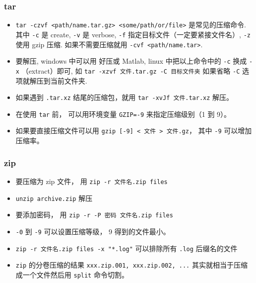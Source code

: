 \subsubsection{tar}
\begin{itemize}
\item \verb`tar -czvf <path/name.tar.gz> <some/path/or/file>` 是常见的压缩命令. 其中 \verb`-c` 是 create, \verb`-v` 是 verbose, \verb`-f` 指定目标文件（一定要紧接文件名）, \verb`-z` 使用 gzip 压缩. 如果不需要压缩就用 \verb`-cvf <path/name.tar>`.
\item 要解压, windows 中可以用 好压或 Matlab, linux 中把以上命令中的 \verb`-c` 换成 \verb`-x` （extract）即可, 如 \verb`tar -xzvf 文件.tar.gz -C 目标文件夹` 如果省略 \verb`-C` 选项就解压到当前文件夹.
\item 如果遇到 \verb|.tar.xz| 结尾的压缩包，就用 \verb|tar -xvJf 文件.tar.xz| 解压。
\item 在使用 \verb|tar| 前， 可以用环境变量 \verb|GZIP=-9| 来指定压缩级别（1 到 9）。
\item 如果要直接压缩文件可以用 \verb|gzip [-9] < 文件 > 文件.gz|， 其中 \verb|-9| 可以增加压缩率。
\end{itemize}

\subsubsection{zip}
\begin{itemize}
\item 要压缩为 zip 文件， 用 \verb|zip -r 文件名.zip files|
\item \verb|unzip archive.zip| 解压
\item 要添加密码， 用 \verb|zip -r -P 密码 文件名.zip files|
\item \verb|-0| 到 \verb|-9| 可以设置压缩等级， 9 得到的文件最小。
\item \verb|zip -r 文件名.zip files -x "*.log"| 可以排除所有 \verb|.log| 后缀名的文件
\item \verb|zip| 的分卷压缩的结果 \verb|xxx.zip.001, xxx.zip.002, ...| 其实就相当于压缩成一个文件然后用 \verb|split| 命令切割。
\end{itemize}

